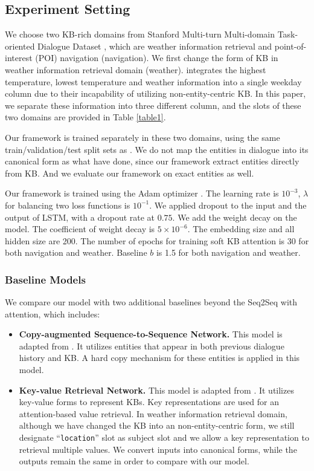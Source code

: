 \documentclass[11pt]{article}
\begin{document}
\subsection{Experiment Setting}
We choose two KB-rich domains from Stanford Multi-turn Multi-domain Task-oriented Dialogue Dataset  , which are weather information retrieval and point-of-interest (POI) navigation (navigation). We first change the form of KB in weather information retrieval domain (weather).  integrates the highest temperature, lowest temperature and weather information into a single weekday column due to their incapability of utilizing non-entity-centric KB. In this paper, we separate these information into three different column, and the slots of these two domains are provided in Table \ref{table1}.

Our framework is trained separately in these two domains, using the same train/validation/test split sets as . We do not map the entities in dialogue into its canonical form as what  have done, since our framework extract entities directly from KB. And we evaluate our framework on exact entities as well.

Our framework is trained using the Adam optimizer \cite{kingma-ba:2014:ICLR}. The learning rate is $10^{-3}$, $\lambda$ for balancing two loss functions is $10^{-1}$. We applied dropout \cite{srivastava:2014:JMLR} to the input and the output of LSTM, with a dropout rate at $0.75$. We add the weight decay on the model. The coefficient of weight decay is $5\times 10^{-6}$. The embedding size and all hidden size are 200. The number of epochs for training soft KB attention is 30 for both navigation and weather. Baseline $b$ is 1.5 for both navigation and weather.
\subsubsection{Baseline Models}
We compare our model with two additional baselines beyond the Seq2Seq with attention, which includes:
\begin{itemize}
\item \textbf{Copy-augmented Sequence-to-Sequence Network.} This model is adapted from \cite{eric-manning:2017:EACL}. It utilizes entities that appear in both previous dialogue history and KB. A hard copy mechanism for these entities is applied in this model.
\item \textbf{Key-value Retrieval Network.} This model is adapted from . It utilizes key-value forms to represent KBs. Key representations are used for an attention-based value retrieval. In weather information retrieval domain, although we have changed the KB into an non-entity-centric form, we still designate ``\texttt{location}'' slot as subject slot and we allow a key representation to retrieval multiple values. We convert inputs into canonical forms, while the outputs remain the same in order to compare with our model.
\end{itemize}
\end{document}
